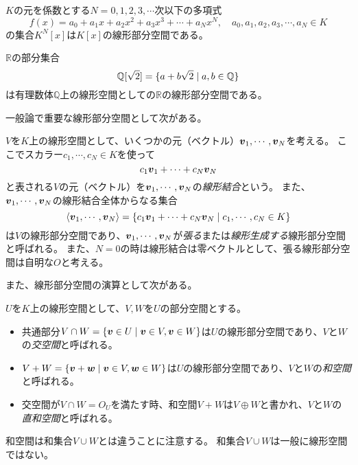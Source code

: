 \begin{example}[有限次多項式空間]
$K$の元を係数とする$N = 0, 1, 2, 3, \cdots$次以下の多項式
$$
f(x) = a_0+a_1 x+a_2 x^2+a_3 x^3+\cdots+a_N x^N,
\quad a_0, a_1, a_2, a_3, \cdots, a_N \in K
$$
の集合$K^N[x]$は$K[x]$の線形部分空間である。
\end{example}

\begin{example}
$\mathbb{R}$の部分集合
$$
\mathbb{Q}[\sqrt{2}] = \{ a+b\sqrt{2} \mid a, b \in \mathbb{Q} \}
$$
は有理数体$\mathbb{Q}$上の線形空間としての$\mathbb{R}$の線形部分空間である。
\end{example}

一般論で重要な線形部分空間として次がある。

\begin{definition}[線形結合]
$V$を$K$上の線形空間として、いくつかの元（ベクトル）$\vb*{v}_1, \cdots, \vb*{v}_N$を考える。
ここでスカラー$c_1, \cdots, c_N \in K$を使って
$$
c_1 \vb*{v}_1+\cdots+c_N \vb*{v}_N
$$
と表される$V$の元（ベクトル）を$\vb*{v}_1, \cdots, \vb*{v}_N$の\emph{線形結合}という。
また、$\vb*{v}_1, \cdots, \vb*{v}_N$の線形結合全体からなる集合
$$
\langle \vb*{v}_1, \cdots, \vb*{v}_N \rangle = \{ c_1 \vb*{v}_1+\cdots+c_N \vb*{v}_N \mid c_1, \cdots, c_N \in K \}
$$
は$V$の線形部分空間であり、$\vb*{v}_1, \cdots, \vb*{v}_N$が\emph{張る}または\emph{線形生成する}線形部分空間と呼ばれる。
また、$N = 0$の時は線形結合は零ベクトルとして、張る線形部分空間は自明な$O$と考える。
\end{definition}

また、線形部分空間の演算として次がある。

\begin{definition}[交わりと和]
$U$を$K$上の線形空間として、$V, W$を$U$の部分空間とする。
\begin{itemize}
\item
共通部分$V\cap W = \{ \vb*{v} \in U \mid \vb*{v} \in V, \vb*{v} \in W \}$は$U$の線形部分空間であり、$V$と$W$の\emph{交空間}と呼ばれる。
\item
$V+W = \{ \vb*{v}+\vb*{w} \mid \vb*{v} \in V, \vb*{w} \in W \}$は$U$の線形部分空間であり、$V$と$W$の\emph{和空間}と呼ばれる。
\item
交空間が$V\cap W = O_U$を満たす時、和空間$V+W$は$V\oplus W$と書かれ、$V$と$W$の\emph{直和空間}と呼ばれる。
\end{itemize}
\end{definition}

\begin{remark}
和空間は和集合$V\cup W$とは違うことに注意する。
和集合$V\cup W$は一般に線形空間ではない。
\end{remark}

